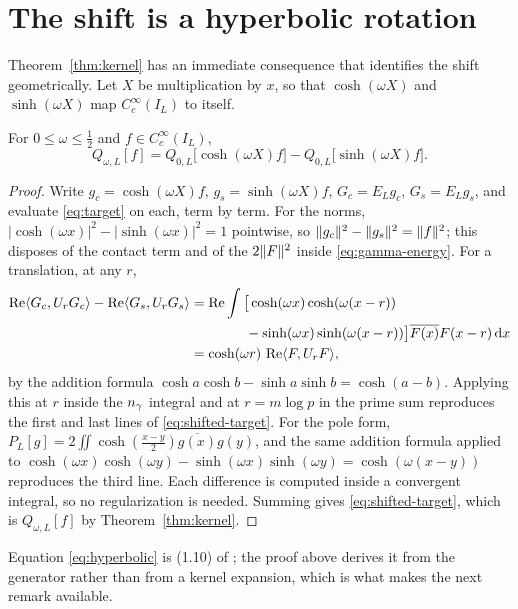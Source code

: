 \section{The shift is a hyperbolic rotation}\label{sec:hyperbolic}

Theorem~\ref{thm:kernel} has an immediate consequence that identifies the shift
geometrically. Let $X$ be multiplication by $x$, so that $\cosh(\omega X)$ and
$\sinh(\omega X)$ map $C_c^\infty(I_L)$ to itself.

\begin{proposition}\label{prop:hyperbolic}
For $0\leq\omega\leq\frac12$ and $f\in C_c^\infty(I_L)$,
\begin{equation}\label{eq:hyperbolic}
 Q_{\omega,L}[f]=Q_{0,L}\big[\cosh(\omega X)f\big]
 -Q_{0,L}\big[\sinh(\omega X)f\big].
\end{equation}
\end{proposition}

\begin{proof}
Write $g_c=\cosh(\omega X)f$, $g_s=\sinh(\omega X)f$, $G_c=E_Lg_c$,
$G_s=E_Lg_s$, and evaluate \eqref{eq:target} on each, term by term. For the
norms, $|\!\cosh(\omega x)|^2-|\!\sinh(\omega x)|^2=1$ pointwise, so
$\lVert g_c\rVert^2-\lVert g_s\rVert^2=\lVert f\rVert^2$; this disposes of the contact term and of
the $2\lVert F\rVert^2$ inside \eqref{eq:gamma-energy}. For a translation, at any
$r$,
\begin{align*}
 \operatorname{Re}\langle G_c,U_rG_c\rangle-\operatorname{Re}\langle G_s,U_rG_s\rangle
 &=\operatorname{Re}\int\big[\cosh(\omega x)\cosh(\omega(x-r))\\
 &\qquad\qquad-\sinh(\omega x)\sinh(\omega(x-r))\big]
   \overline{F(x)}F(x-r)\,\mathrm d x\\
 &=\cosh(\omega r)\,\operatorname{Re}\langle F,U_rF\rangle,
\end{align*}
by the addition formula $\cosh a\cosh b-\sinh a\sinh b=\cosh(a-b)$. Applying this
at $r$ inside the $n_{\gamma}$ integral and at $r=m\log p$ in the prime sum
reproduces the first and last lines of \eqref{eq:shifted-target}. For the pole
form, $P_L[g]=2\iint\cosh(\frac{x-y}2)\overline{g(x)}g(y)$, and the same addition
formula applied to $\cosh(\omega x)\cosh(\omega y)-\sinh(\omega x)\sinh(\omega y)
=\cosh(\omega(x-y))$ reproduces the third line. Each difference is computed
inside a convergent integral, so no regularization is needed. Summing gives
\eqref{eq:shifted-target}, which is $Q_{\omega,L}[f]$ by
Theorem~\ref{thm:kernel}.
\end{proof}

Equation \eqref{eq:hyperbolic} is (1.10) of \cite{Background}; the proof above
derives it from the generator rather than from a kernel expansion, which is what
makes the next remark available.

